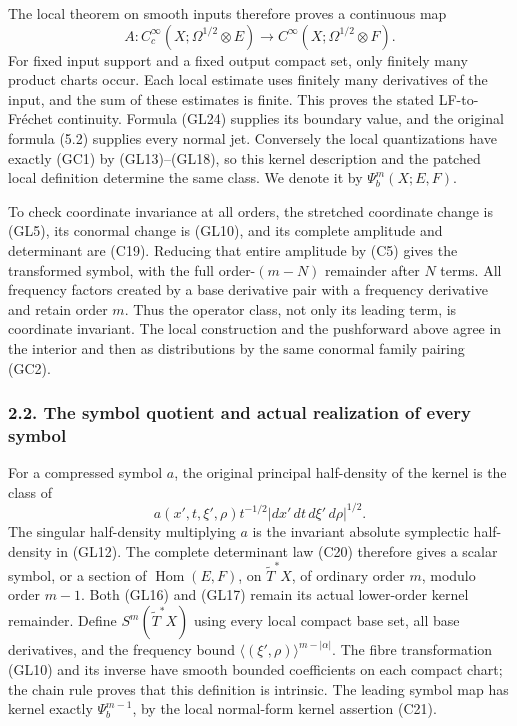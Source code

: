 \documentclass[
  11pt,
]{article}
\begin{document}
The local theorem on smooth inputs therefore proves a continuous map \[
 A:C_c^\infty(X;\Omega^{1/2}\otimes E)
       \longrightarrow C^\infty(X;\Omega^{1/2}\otimes F).
 \tag{GC4}
\] For fixed input support and a fixed output compact set, only finitely
many product charts occur. Each local estimate uses finitely many
derivatives of the input, and the sum of these estimates is finite. This
proves the stated LF-to-Fréchet continuity. Formula (GL24) supplies its
boundary value, and the original formula (5.2) supplies every normal
jet. Conversely the local quantizations have exactly (GC1) by
(GL13)--(GL18), so this kernel description and the patched local
definition determine the same class. We denote it by
\(\Psi_b^m(X;E,F)\).

To check coordinate invariance at all orders, the stretched coordinate
change is (GL5), its conormal change is (GL10), and its complete
amplitude and determinant are (C19). Reducing that entire amplitude by
(C5) gives the transformed symbol, with the full order-\((m-N)\)
remainder after \(N\) terms. All frequency factors created by a base
derivative pair with a frequency derivative and retain order \(m\). Thus
the operator class, not only its leading term, is coordinate invariant.
The local construction and the pushforward above agree in the interior
and then as distributions by the same conormal family pairing (GC2).

\subsubsection{2.2. The symbol quotient and actual realization of every
symbol}\label{the-symbol-quotient-and-actual-realization-of-every-symbol}

For a compressed symbol \(a\), the original principal half-density of
the kernel is the class of \[
 a(x',t,\xi',\rho)t^{-1/2}
       |dx'\,dt\,d\xi'\,d\rho|^{1/2}.
 \tag{GC5}
\] The singular half-density multiplying \(a\) is the invariant absolute
symplectic half-density in (GL12). The complete determinant law (C20)
therefore gives a scalar symbol, or a section of
\(\operatorname{Hom}(E,F)\), on \(\widetilde T^*X\), of ordinary order
\(m\), modulo order \(m-1\). Both (GL16) and (GL17) remain its actual
lower-order kernel remainder. Define \(S^m(\widetilde T^*X)\) using
every local compact base set, all base derivatives, and the frequency
bound \(\langle(\xi',\rho)\rangle^{m-|\alpha|}\). The fibre
transformation (GL10) and its inverse have smooth bounded coefficients
on each compact chart; the chain rule proves that this definition is
intrinsic. The leading symbol map has kernel exactly \(\Psi_b^{m-1}\),
by the local normal-form kernel assertion (C21).
\end{document}
